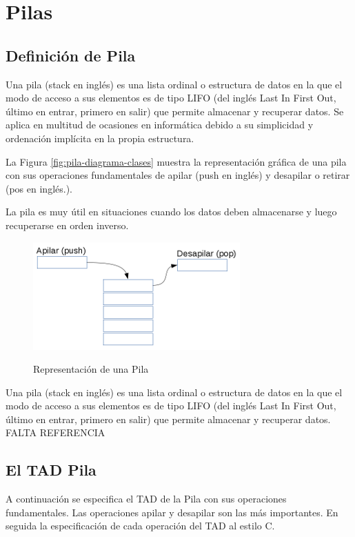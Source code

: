 \chapter{Pilas}

\section{Definición de Pila}
Una pila (stack en inglés) es una lista ordinal o estructura de datos en la que el modo de acceso a sus elementos es de tipo LIFO (del inglés Last In First Out, último en entrar, primero en salir) que permite almacenar y recuperar datos. Se aplica en multitud de ocasiones en informática debido a su simplicidad y ordenación implícita en la propia estructura. 

La Figura  \ref{fig:pila-diagrama-clases} muestra la representación gráfica de una pila con sus operaciones fundamentales de apilar (push en inglés) y desapilar o retirar (pos en inglés.).

La pila es muy útil en situaciones cuando los datos deben almacenarse y luego recuperarse en orden inverso.

\begin{figure}
	\centering\textbf{}
		\includegraphics{Diagramas/RepresentacionPila}
	\caption{Representación de una Pila}	
	\label{fig:pila-representacion}
\end{figure}

\begin{definicion}
Una pila (stack en inglés) es una lista ordinal o estructura de datos en la que el modo de acceso a sus elementos es de tipo LIFO (del inglés Last In First Out, último en entrar, primero en salir) que permite almacenar y recuperar datos. FALTA REFERENCIA
\end{definicion}

\section{El TAD Pila}
A continuación se especifica el TAD de la Pila con sus operaciones fundamentales. Las operaciones apilar y desapilar son las más importantes. En seguida la especificación de cada operación del TAD al estilo C.

